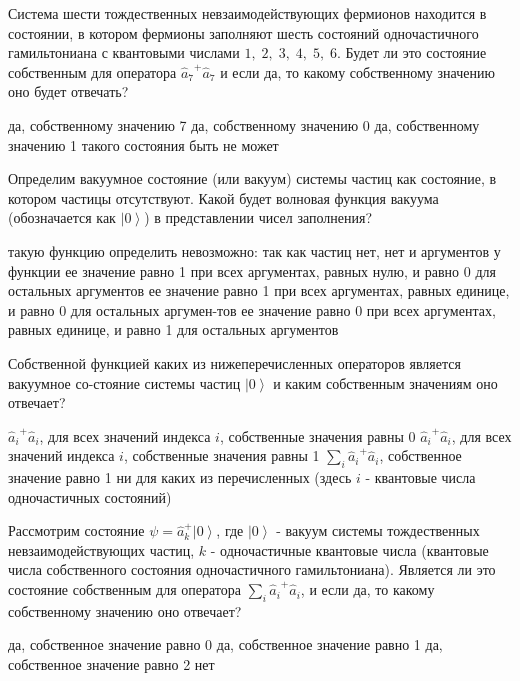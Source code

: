\documentclass[11pt,a4paper]{exam}
\begin{document}
\begin{questions}
\question Система шести тождественных невзаимодействующих фермионов находится в состоянии, в котором фермионы заполняют шесть состояний одночастичного гамильтониана с квантовыми числами $1,\;2,\;3,\;4,\;5,\;6$. Будет ли это состояние собственным для оператора ${\hat a_7}^ + {\hat a_7}$ и если да, то какому собственному значению оно будет отвечать?
\begin{choices}
\choice да, собственному значению 7
\choice да, собственному значению 0
\choice да, собственному значению 1
\choice такого состояния быть не может
\end{choices}

\question Определим вакуумное состояние (или вакуум) системы частиц как состояние, в котором частицы отсутствуют. Какой будет волновая функция вакуума (обозначается как $\left| 0 \right\rangle $) в представлении чисел заполнения?
\begin{choices}
\choice такую функцию определить невозможно: так как частиц нет, нет и аргументов у функции
\choice ее значение равно 1 при всех аргументах, равных нулю, и равно 0 для остальных аргументов
\choice ее значение равно 1 при всех аргументах, равных единице, и равно 0 для остальных аргумен-тов
\choice ее значение равно 0 при всех аргументах, равных единице, и равно 1 для остальных аргументов
\end{choices}

\question Собственной функцией каких из нижеперечисленных операторов является вакуумное со-стояние системы частиц $\left| 0 \right\rangle $ и каким собственным значениям оно отвечает?
\begin{choices}
\choice ${\hat a_i}^ + {\hat a_i}$, для всех значений индекса $i$, собственные значения равны 0
\choice ${\hat a_i}^ + {\hat a_i}$, для всех значений индекса $i$, собственные значения равны 1
\choice $\sum\limits_i {{{\hat a}_i}^ + {{\hat a}_i}} $, собственное значение равно 1
\choice ни для каких из перечисленных
(здесь $i$ - квантовые числа одночастичных состояний)
\end{choices}

\question Рассмотрим состояние $\psi  = \hat a_k^ + \left| 0 \right\rangle $, где $\left| 0 \right\rangle $ - вакуум системы тождественных невзаимодействующих частиц, $k$ - одночастичные квантовые числа (квантовые числа собственного состояния одночастичного гамильтониана). Является ли это состояние собственным для оператора $\sum\limits_i {{{\hat a}_i}^ + {{\hat a}_i}} $, и если да, то какому собственному значению оно отвечает?
\begin{choices}
\choice да, собственное значение равно 0    
\choice да, собственное значение равно 1
\choice да, собственное значение равно 2    
\choice нет
\end{choices}


\end{questions}
\end{document}

